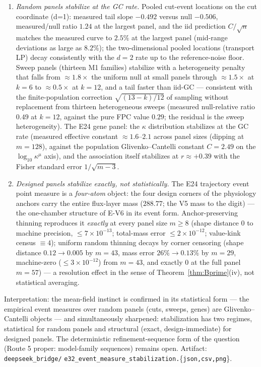 \documentclass[11pt,a4paper]{article}
\theoremstyle{plain}
\theoremstyle{definition}
\theoremstyle{remark}
\newcommand{\kmu}{\kappa^{\mu}}
\begin{document}
\begin{enumerate}[label=(\roman*),leftmargin=2em]
\item \emph{Random panels stabilize at the GC rate.} Pooled cut-event
      locations on the cut coordinate (d=1): measured tail slope
      $-0.492$ versus null $-0.506$, measured/null ratio $1.24$ at
      the largest panel, and the iid prediction $C/\sqrt{n}$ matches
      the measured curve to $2.5\%$ at the largest panel (mid-range
      deviations as large as $8.2\%$); the two-dimensional pooled
      locations (transport LP) decay consistently with the $d=2$ rate
      up to the reference-noise floor. Sweep panels (thirteen M1
      families) stabilize with a heterogeneity penalty that falls
      from $\approx1.8\times$ the uniform null at small panels
      through $\approx1.5\times$ at $k = 6$ to $\approx0.5\times$ at
      $k = 12$, and a tail faster than iid-GC --- consistent with the
      finite-population correction
      $\sqrt{(13-k)/12}$ of sampling without replacement from
      thirteen heterogeneous sweeps (measured null-relative ratio
      $0.49$ at $k = 12$, against the pure FPC value $0.29$; the
      residual is the sweep heterogeneity). The E24 gene panel: the
      $\kappa$ distribution stabilizes at the GC rate (measured
      effective constant $\approx 1.6$--$2.1$ across panel sizes
      (dipping at $m = 128$), against the population
      Glivenko--Cantelli constant $C = 2.49$
      on the $\log_{10}\kmu$ axis), and the association itself
      stabilizes at $r \approx +0.39$ with the Fisher standard error
      $1/\sqrt{m-3}$.
\item \emph{Designed panels stabilize exactly, not statistically.}
      The E24 trajectory event point measure is a \emph{four-atom}
      object: the four design corners of the physiology anchors
      carry the entire flux-layer mass ($288.77$; the V5 mass to the
      digit) --- the one-chamber structure of E-V6 in its event form.
      Anchor-preserving thinning reproduces it \emph{exactly} at every
      panel size $m \ge 8$ (shape distance $0$ to machine precision,
      $\le 7 \times 10^{-13}$; total-mass error $\le 2 \times
      10^{-12}$; value-kink census $\equiv 4$); uniform random
      thinning decays by corner censoring (shape distance
      $0.12 \to 0.005$ by $m = 43$, mass error $26\% \to 0.13\%$ by
      $m = 29$, machine-zero ($\le 3 \times 10^{-12}$) from
      $m = 43$, and exactly $0$ at the full panel $m = 57$) --- a
      resolution effect in the sense of Theorem~\ref{thm:Bprime}(iv),
      not statistical averaging.
\end{enumerate}
Interpretation: the mean-field instinct is confirmed in its
statistical form --- the empirical event measures over random panels
(cuts, sweeps, genes) are Glivenko--Cantelli objects --- and
simultaneously sharpened: stabilization has two regimes, statistical
for random panels and structural (exact, design-immediate) for
designed panels. The deterministic refinement-sequence form of the
question (Route 5 proper: model-family sequences) remains open.
Artifact: \texttt{deepseek\_bridge/}
\texttt{e32\_event\_measure\_stabilization.}\{\texttt{json,csv,png}\}.
\end{document}
